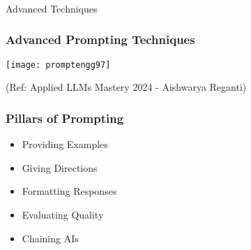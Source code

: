 \begin{frame}[fragile]\frametitle{}
\begin{center}
{\Large Advanced Techniques}
\end{center}
\end{frame}


\begin{frame}[fragile]\frametitle{Advanced Prompting Techniques}

\begin{center}
\texttt{[image: promptengg97]}
\end{center}				

{\tiny (Ref: Applied LLMs Mastery 2024 - Aishwarya Reganti)}

\end{frame}


\begin{frame}[fragile]\frametitle{Pillars of Prompting}

\begin{itemize}
\item Providing Examples
\item Giving Directions
\item Formatting Responses
\item Evaluating Quality
\item Chaining AIs
\end{itemize}	 

\end{frame}






					



